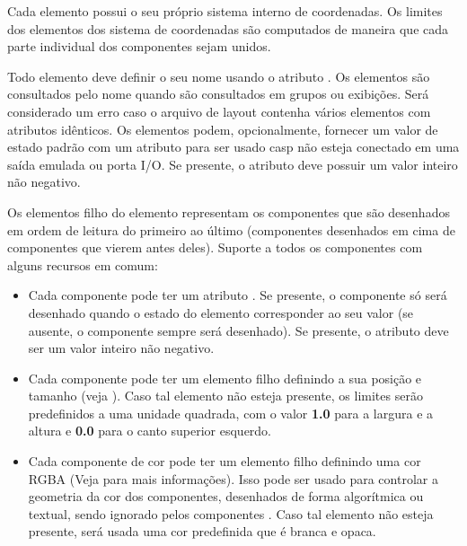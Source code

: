 \documentclass[letterpaper,10pt,brazil]{sphinxmanual}
\begin{document}
Cada elemento possui o seu próprio sistema interno de coordenadas. Os
limites dos elementos dos sistema de coordenadas são computados de
maneira que cada parte individual dos componentes sejam unidos.

Todo elemento deve definir o seu nome usando o atributo . Os
elementos são consultados pelo nome quando são consultados em grupos ou
exibições. Será considerado um erro caso o arquivo de layout
contenha vários elementos com atributos  idênticos.
Os elementos podem, opcionalmente, fornecer um valor de estado padrão
com um atributo  para ser usado casp não esteja conectado em
uma saída emulada ou porta I/O. Se presente, o atributo 
deve possuir um valor inteiro não negativo.

Os elementos filho do elemento  representam os componentes
que são desenhados em ordem de leitura do primeiro ao último
(componentes desenhados em cima de componentes que vierem antes deles).
Suporte a todos os componentes com alguns recursos em comum:
\begin{itemize}
\item {} 
Cada componente pode ter um atributo . Se presente, o
componente só será desenhado quando o estado do elemento corresponder
ao seu valor (se ausente, o componente sempre será desenhado).
Se presente, o atributo  deve ser um valor inteiro não
negativo.

\item {} 
Cada componente pode ter um elemento filho  definindo a
sua posição e tamanho (veja {\hyperref[techspecs/layout_files:layout\string-concepts\string-coordinates]{}}). Caso
tal elemento não esteja presente, os limites serão predefinidos a uma
unidade quadrada, com o valor \textbf{1.0} para a largura e a altura e
\textbf{0.0} para o canto superior esquerdo.

\item {} 
Cada componente de cor pode ter um elemento filho  definindo
uma cor RGBA (Veja {\hyperref[techspecs/layout_files:layout\string-concepts\string-colours]{}} para mais
informações).
Isso pode ser usado para controlar a geometria da cor dos componentes,
desenhados de forma algorítmica ou textual, sendo ignorado pelos
componentes . Caso tal elemento não esteja presente,
será usada uma cor predefinida que é branca e opaca.

\end{itemize}
\end{document}
